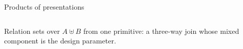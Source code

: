 \begin{frame}{Products of presentations \InPaper}
\begin{columns}[c]
\begin{column}{0.56\textwidth}
Relation sets over $A \uplus B$ from one primitive: a three-way join whose
\alert{mixed} component is the design parameter.
\begin{code}%
\>[0]\AgdaSpace{}%
%
\>[260I]\AgdaSymbol{(}\AgdaSpace{}%
\AgdaSymbol{:}\AgdaSpace{}%
\AgdaSpace{}%
\AgdaSymbol{)}\AgdaSpace{}%
\AgdaSymbol{(}\AgdaSpace{}%
\AgdaSymbol{:}\AgdaSpace{}%
\AgdaSpace{}%
\AgdaSymbol{)}\AgdaSpace{}%
\AgdaSymbol{(}\AgdaSpace{}%
\AgdaSymbol{:}\AgdaSpace{}%
\AgdaSpace{}%
\AgdaSymbol{(}\AgdaSpace{}%
\AgdaSpace{}%
\AgdaSymbol{))}\<%
\\
\>[.][@{}l@{}]\<[260I]%
\>[11]\AgdaSymbol{:}\AgdaSpace{}%
\AgdaSpace{}%
\AgdaSymbol{(}\AgdaSpace{}%
\AgdaSpace{}%
\AgdaSymbol{)}\AgdaSpace{}%
\<%
\\
\>[0][@{}l@{\AgdaIndent{0}}]%
\>[2]%
\>[8]\AgdaSymbol{:}\AgdaSpace{}%
\AgdaSpace{}%
\AgdaSpace{}%
\AgdaSpace{}%
\AgdaSpace{}%
\AgdaSymbol{(}\AgdaSpace{}%
\AgdaSpace{}%
\AgdaSpace{}%
\AgdaSpace{}%
\AgdaSymbol{)}\AgdaSpace{}%
\AgdaOperator{\AgdaFunction{[}}\AgdaSpace{}%
\AgdaSpace{}%
\AgdaOperator{\AgdaFunction{]ₗ}}\AgdaSpace{}%
\AgdaOperator{\AgdaFunction{[}}\AgdaSpace{}%
\AgdaSpace{}%
\AgdaOperator{\AgdaFunction{]ₗ}}\<%
\\
%
\>[2]\AgdaSpace{}%
\AgdaSymbol{:}\AgdaSpace{}%
\AgdaSpace{}%
\AgdaSpace{}%
\AgdaSpace{}%
\AgdaSpace{}%
\AgdaSymbol{(}\AgdaSpace{}%
\AgdaSpace{}%
\AgdaSpace{}%
\AgdaSpace{}%
\AgdaSymbol{)}\AgdaSpace{}%
\AgdaOperator{\AgdaFunction{[}}\AgdaSpace{}%
\AgdaSpace{}%
\AgdaOperator{\AgdaFunction{]ᵣ}}\AgdaSpace{}%

\end{code}
\end{column}
\end{columns}
\end{frame}
